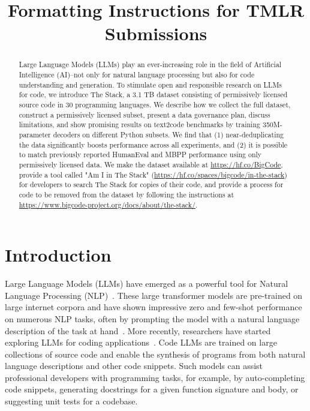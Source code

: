 \title{Formatting Instructions for TMLR Submissions}

\begin{abstract}
Large Language Models (LLMs) play an ever-increasing role in the field of Artificial Intelligence (AI)--not only for natural language processing but also for code understanding and generation. To stimulate open and responsible research on LLMs for code, we introduce The Stack, a 3.1 TB dataset consisting of permissively licensed source code in 30 programming languages. We describe how we collect the full dataset, construct a permissively licensed subset, present a data governance plan, discuss limitations, and show promising results on text2code benchmarks by training 350M-parameter decoders on different Python subsets. We find that (1) near-deduplicating the data significantly boosts performance across all experiments, and (2) it is possible to match previously reported HumanEval and MBPP performance using only permissively licensed data. We make the dataset available at \url{https://hf.co/BigCode}, provide a tool called "Am I in The Stack" (\url{https://hf.co/spaces/bigcode/in-the-stack}) for developers to search The Stack for copies of their code, and provide a process for code to be removed from the dataset by following the instructions at \url{https://www.bigcode-project.org/docs/about/the-stack/}.
\end{abstract}

\section{Introduction}
Large Language Models (LLMs) have emerged as a powerful tool for Natural Language Processing (NLP)~\citep{brown2020language,stanford2022foundation,zhang2022opt,chowdhery2022palm,bigscience_workshop_2022}. These large transformer models are pre-trained on large internet corpora and have shown impressive zero and few-shot performance on numerous NLP tasks, often by prompting the model with a natural language description of the task at hand~\citep{brown2020language}. More recently, researchers have started exploring LLMs for coding applications~\citep{chen2021codex,fried2022incoder,Nijkamp2022ACP}. Code LLMs are trained on large collections of source code and enable the synthesis of programs from both natural language descriptions and other code snippets. Such models can assist professional developers with programming tasks, for example, by auto-completing code snippets, generating docstrings for a given function signature and body, or suggesting unit tests for a codebase. 

